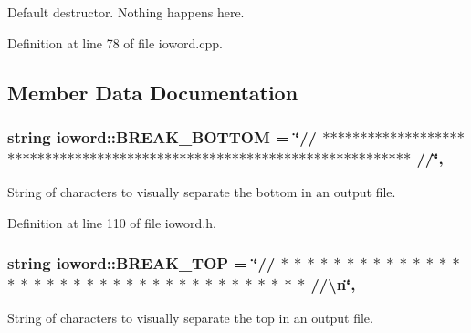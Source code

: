 Default destructor. Nothing happens here. 



Definition at line 78 of file ioword.\-cpp.



\subsection{Member Data Documentation}
\hypertarget{classosea_1_1ofreq_1_1ioword_acbe9d35566f3a8ef7a8993f3fb14a11d}{
\subsubsection[{B\-R\-E\-A\-K\-\_\-\-B\-O\-T\-T\-O\-M}]{\setlength{\rightskip}{0pt plus 5cm}string ioword\-::\-B\-R\-E\-A\-K\-\_\-\-B\-O\-T\-T\-O\-M = \char`\"{}// $\ast$$\ast$$\ast$$\ast$$\ast$$\ast$$\ast$$\ast$$\ast$$\ast$$\ast$$\ast$$\ast$$\ast$$\ast$$\ast$$\ast$$\ast$$\ast$$\ast$$\ast$$\ast$$\ast$$\ast$$\ast$$\ast$$\ast$$\ast$$\ast$$\ast$$\ast$$\ast$$\ast$$\ast$$\ast$$\ast$$\ast$$\ast$$\ast$$\ast$$\ast$$\ast$$\ast$$\ast$$\ast$$\ast$$\ast$$\ast$$\ast$$\ast$$\ast$$\ast$$\ast$$\ast$$\ast$$\ast$$\ast$$\ast$$\ast$$\ast$$\ast$$\ast$$\ast$$\ast$$\ast$$\ast$$\ast$$\ast$$\ast$$\ast$$\ast$$\ast$$\ast$ //\char`\"{}\hspace{0.3cm}{\ttfamily [static]}, {\ttfamily [protected]}}}\label{classosea_1_1ofreq_1_1ioword_acbe9d35566f3a8ef7a8993f3fb14a11d}
String of characters to visually separate the bottom in an output file. 

Definition at line 110 of file ioword.\-h.

\hypertarget{classosea_1_1ofreq_1_1ioword_ae34010793caf6a026dcf1e5942e49cb3}{
\subsubsection[{B\-R\-E\-A\-K\-\_\-\-T\-O\-P}]{\setlength{\rightskip}{0pt plus 5cm}string ioword\-::\-B\-R\-E\-A\-K\-\_\-\-T\-O\-P = \char`\"{}// $\ast$ $\ast$ $\ast$ $\ast$ $\ast$ $\ast$ $\ast$ $\ast$ $\ast$ $\ast$ $\ast$ $\ast$ $\ast$ $\ast$ $\ast$ $\ast$ $\ast$ $\ast$ $\ast$ $\ast$ $\ast$ $\ast$ $\ast$ $\ast$ $\ast$ $\ast$ $\ast$ $\ast$ $\ast$ $\ast$ $\ast$ $\ast$ $\ast$ $\ast$ $\ast$ $\ast$ $\ast$ //\textbackslash{}n\char`\"{}\hspace{0.3cm}{\ttfamily [static]}, {\ttfamily [protected]}}}\label{classosea_1_1ofreq_1_1ioword_ae34010793caf6a026dcf1e5942e49cb3}
String of characters to visually separate the top in an output file. 

